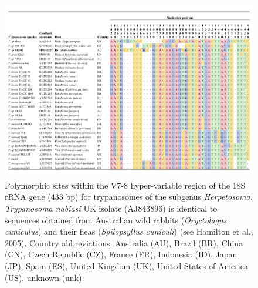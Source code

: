 \documentclass[a4paper, nobind]{templates/ociamthesis}
\begin{document}
\begin{figure}
\includegraphics[width=0.95\linewidth]{figures/ms-figs/Ch5-Fig2} \caption[Nucleotide alignment of \textit{Trypanosoma lewisi} clade.]{Polymorphic sites within the V7-8 hyper-variable region of the 18S rRNA gene (433 bp) for trypanosomes of the subgenus \textit{Herpetosoma}. \textit{Trypanosoma nabiasi} UK isolate (AJ843896) is identical to sequences obtained from Australian wild rabbits (\textit{Oryctolagus cuniculus}) and their fleas (\textit{Spilopsyllus cuniculi}) (see Hamilton et al., 2005). Country abbreviations; Australia (AU), Brazil (BR), China (CN), Czech Republic (CZ), France (FR), Indonesia (ID), Japan (JP), Spain (ES), United Kingdom (UK), United States of America (US), unknown (unk).}\label{fig:F52}
\end{figure}
\end{document}
